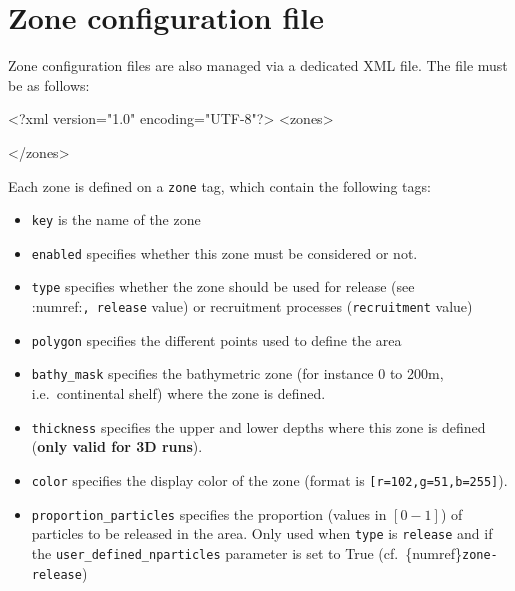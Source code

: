 \documentclass[
  letterpaper,
  DIV=11,
  numbers=noendperiod]{scrreprt}
\newenvironment{Shaded}{\begin{snugshade}}{\end{snugshade}}
\newcommand{\FunctionTok}[1]{\textcolor[rgb]{0.28,0.35,0.67}{#1}}
\newcommand{\KeywordTok}[1]{\textcolor[rgb]{0.00,0.23,0.31}{#1}}
\newcommand{\NormalTok}[1]{\textcolor[rgb]{0.00,0.23,0.31}{#1}}
\newcommand{\OtherTok}[1]{\textcolor[rgb]{0.00,0.23,0.31}{#1}}
\newcommand{\StringTok}[1]{\textcolor[rgb]{0.13,0.47,0.30}{#1}}
\providecommand{\tightlist}{%
  \setlength{\itemsep}{0pt}\setlength{\parskip}{0pt}}\usepackage{longtable,booktabs,array}
\begin{document}
\section{Zone configuration file}\label{sec-zone-xml-config}

Zone configuration files are also managed via a dedicated XML file. The
file must be as follows:

\begin{Shaded}
\begin{Highlighting}[]
\FunctionTok{\textless{}?xml}\OtherTok{ version=}\StringTok{"1.0"}\OtherTok{ encoding=}\StringTok{"UTF{-}8"}\FunctionTok{?\textgreater{}}
\NormalTok{\textless{}}\KeywordTok{zones}\NormalTok{\textgreater{}}

\NormalTok{\textless{}/}\KeywordTok{zones}\NormalTok{\textgreater{}}
\end{Highlighting}
\end{Shaded}

Each zone is defined on a \texttt{zone} tag, which contain the following
tags:

\begin{itemize}
\tightlist
\item
  \texttt{key} is the name of the zone
\item
  \texttt{enabled} specifies whether this zone must be considered or
  not.
\item
  \texttt{type} specifies whether the zone should be used for release
  (see :numref:\texttt{,\ \textasciigrave{}\textasciigrave{}release}
  value) or recruitment processes (\texttt{recruitment} value)
\item
  \texttt{polygon} specifies the different points used to define the
  area
\item
  \texttt{bathy\_mask} specifies the bathymetric zone (for instance 0 to
  200m, i.e.~continental shelf) where the zone is defined.
\item
  \texttt{thickness} specifies the upper and lower depths where this
  zone is defined (\textbf{only valid for 3D runs}).
\item
  \texttt{color} specifies the display color of the zone (format is
  \texttt{{[}r=102,g=51,b=255{]}}).
\item
  \texttt{proportion\_particles} specifies the proportion (values in
  \([0-1]\)) of particles to be released in the area. Only used when
  \texttt{type} is \texttt{release} and if the
  \texttt{user\_defined\_nparticles} parameter is set to True
  (cf.~\{numref\}\texttt{zone-release})
\end{itemize}
\end{document}
